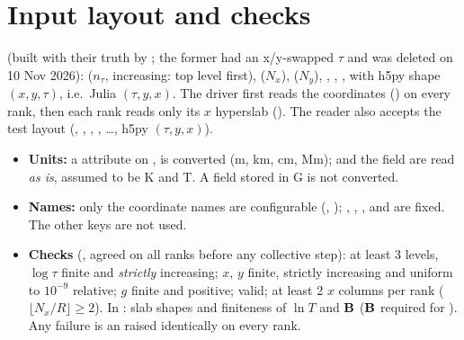 \section{Input layout and checks}
 (built with their truth by ; the former
 had an x/y-swapped $\tau$ and was deleted on 10 Nov 2026):  ($n_\tau$, increasing: top level first),  ($N_x$),  ($N_y$),
, , ,  with h5py shape $(x,y,\tau)$, i.e.\ Julia $(\tau,y,x)$. The driver
first reads the coordinates () on every rank, then each rank reads only its $x$ hyperslab
(). The reader also accepts the  test layout (, ,
, , \dots, h5py $(\tau,y,x)$).
\begin{itemize}
\item \textbf{Units:} a  attribute on ,  is converted (m, km, cm, Mm);  and the field
are read \emph{as is}, assumed to be K and T. A field stored in G is not converted.
\item \textbf{Names:} only the coordinate names are configurable (, ); ,
, ,  and  are fixed. The other \code{[input]} keys are not used.
\item \textbf{Checks} (, agreed on all ranks before any collective step): at least 3 levels,
$\log\tau$ finite and \emph{strictly} increasing; $x$, $y$ finite, strictly increasing and uniform to $10^{-9}$ relative;
$g$ finite and positive;  valid; at least 2 $x$ columns per rank ($\lfloor N_x/R\rfloor\ge2$). In
: slab shapes and finiteness of $\ln T$ and $\mathbf B$ ($\mathbf B$ required for ). Any
failure is an  raised identically on every rank.
\end{itemize}

